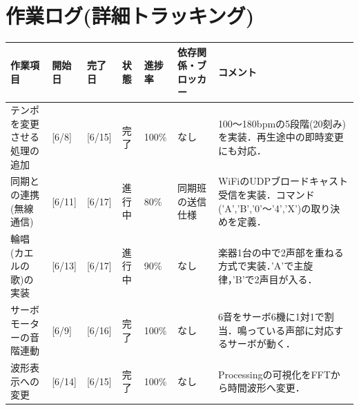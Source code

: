 \documentclass[uplatex,dvipdfmx]{jlreq}
\begin{document}
\section{作業ログ(詳細トラッキング)}
\begin{table}[H]
    \centering
    \small
    \begin{tabular}{lp{1.5cm}p{1.5cm}llp{2.5cm}p{3cm}}
        \toprule
        作業項目 & 開始日 & 完了日 & 状態 & 進捗率 & 依存関係・ブロッカー & コメント \\
        \midrule
        テンポを変更させる処理の追加 & [6/8] & [6/15] & 完了 & 100\% & なし & 100〜180bpmの5段階(20刻み)を実装．再生途中の即時変更にも対応． \\
        同期との連携(無線通信) & [6/11] & [6/17] & 進行中 & 80\% & 同期班の送信仕様 & WiFiのUDPブロードキャスト受信を実装．コマンド('A','B','0'〜'4','X')の取り決めを定義． \\
        輪唱(カエルの歌)の実装 & [6/13] & [6/17] & 進行中 & 90\% & なし & 楽器1台の中で2声部を重ねる方式で実装．'A'で主旋律，'B'で2声目が入る． \\
        サーボモーターの音階連動 & [6/9] & [6/16] & 完了 & 100\% & なし & 6音をサーボ6機に1対1で割当．鳴っている声部に対応するサーボが動く． \\
        波形表示への変更 & [6/14] & [6/15] & 完了 & 100\% & なし & Processingの可視化をFFTから時間波形へ変更． \\
        \bottomrule
    \end{tabular}
\end{table}
\end{document}
